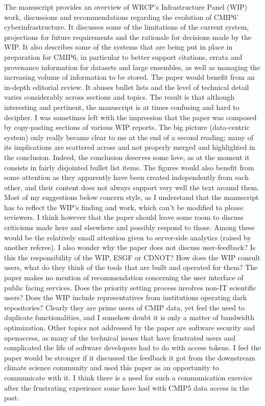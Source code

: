 \documentclass[gmd,manuscript]{copernicus}
\begin{document}
The manuscript provides an overview of WRCP’s Infrastructure Panel
(WIP) work, discussions and recommendations regarding the evolution of
CMIP6’ cyberinfrastructure. It discusses some of the limitations of
the current system, projections for future requirements and the
rationale for decisions made by the WIP. It also describes some of the
systems that are being put in place in preparation for CMIP6, in
particular to better support citations, errata and provenance
information for datasets and large ensembles, as well as managing the
increasing volume of information to be stored. The paper would benefit
from an in-depth editorial review. It abuses bullet lists and the
level of technical detail varies considerably across sections and
topics. The result is that although interesting and pertinent, the
manuscript is at times confusing and hard to decipher. I was sometimes
left with the impression that the paper was composed by copy-pasting
sections of various WIP reports. The big picture (data-centric system)
only really became clear to me at the end of a second reading; many of
its implications are scattered across and not properly merged and
highlighted in the conclusion. Indeed, the conclusion deserves some
love, as at the moment it consists in fairly disjointed bullet list
items. The figures would also benefit from some attention as they
apparently have been created independently from each other, and their
content does not always support very well the text around them. Most
of my suggestions below concern style, as I understand that the
manuscript has to reflect the WIP’s finding and work, which can’t be
modified to please reviewers. I think however that the paper should
leave some room to discuss criticisms made here and elsewhere and
possibly respond to those. Among these would be the relatively small
attention given to server-side analytics (raised by another referee).
I also wonder why the paper does not discuss user-feedback? Is this
the responsibility of the WIP, ESGF or CDNOT? How does the WIP consult
users, what do they think of the tools that are built and operated for
them? The paper makes no mention of recommendation concerning the user
interface of public facing services. Does the priority setting process
involves non-IT scientific users? Does the WIP include representatives
from institutions operating dark repositories? Clearly they are prime
users of CMIP data, yet feel the need to duplicate functionalities,
and I somehow doubt it is only a matter of bandwidth optimization.
Other topics not addressed by the paper are software security and
openaccess, as many of the technical issues that have frustrated users
and complicated the life of software developers had to do with access
tokens. I feel the paper would be stronger if it discussed the
feedback it got from the downstream climate science community and used
this paper as an opportunity to communicate with it. I think there is
a need for such a communication exercice after the frustrating
experience some have had with CMIP5 data access in the past.
\end{document}

